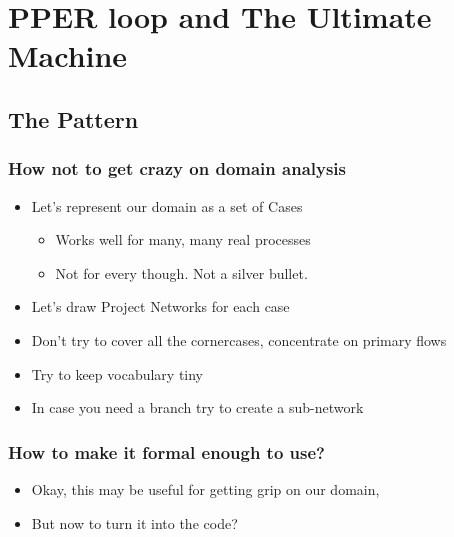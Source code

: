 \documentclass{beamer}
\begin{document}
\section{PPER loop and The Ultimate Machine}
\subsection{The Pattern}
\begin{frame}
    \frametitle{How not to get crazy on domain analysis}  
\begin{itemize}
    \item Let's represent our domain as a set of Cases
    \begin{itemize}
        \item Works well for many, many real processes
        \item Not for every though. Not a silver bullet.         
    \end{itemize}   
    \item Let's draw Project Networks for each case
    \item Don't try to cover all the cornercases, concentrate on primary flows 
    \item Try to keep vocabulary tiny
    \item In case you need a branch try to create a sub-network
\end{itemize}
\end{frame}

\begin{frame}
    \frametitle{How to make it formal enough to use?}  
    
\begin{itemize}
    \item Okay, this may be useful for getting grip on our domain,
    \item But now to turn it into the code?
\end{itemize}
\end{frame}
\end{document}
